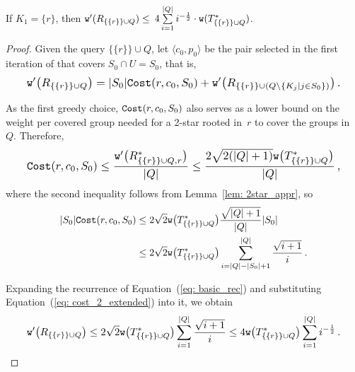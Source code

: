 \begin{lemma}
\label{lem: basic_appr}
    If $K_1=\{r\}$, then $\mathtt{w}'(R_{\{\{r\}\} \cup Q})\leq$
    $4\sum\limits_{i=1}^{|Q|}i^{-\frac{1}{2}}\cdot\mathtt{w}(T^*_{\{\{r\}\}\cup Q})$.
\end{lemma}
\begin{proof}
    Given the query $\{\{r\}\} \cup Q$, let $\langle c_0,p_0 \rangle$ be the pair selected in the first iteration of \Basic that covers $S_0 \cap U = S_0$, that is,
    \begin{equation}
    \label{eq: basic_rec}
    \resizebox{0.92\linewidth}{!}{$
    \displaystyle
        \w'\big(R_{\{\{r\}\}\cup Q}\big) = |S_0|\Cost(r,c_0,S_0) + \w'\big(R_{\{\{r\}\}\cup( Q\setminus \{K_j \mid j \in S_0\} )}\big) \,.
    $}
    \end{equation}
    
    As the first greedy choice, $\mathtt{Cost}(r,c_0,S_0)$ also serves as a lower bound on the weight per covered group needed for a 2-star rooted in~$r$ to cover the groups in~$Q$. Therefore,
    \begin{equation}
    \label{eq: cost_2}
    \resizebox{0.92\linewidth}{!}{$
    \displaystyle
        \Cost(r,c_0,S_0) \leq \frac{\w'\big(R^*_{\{\{r\}\}\cup Q, r}\big)}{|Q|} \leq \frac{2\sqrt{2(|Q|+1)}\w\big(T^*_{\{\{r\}\}\cup Q}\big)}{|Q|} \,,
    $}
    \end{equation}
    \noindent where the second inequality follows from Lemma~\ref{lem: 2star_appr}, so
    \begin{equation}
    \begin{aligned}
    \label{eq: cost_2_extended}
        |S_0|\mathtt{Cost}(r,c_0,S_0) & \leq 2\sqrt{2}\mathtt{w}\big(T^*_{\{\{r\}\}\cup Q}\big)\frac{\sqrt{|Q|+1}}{|Q|}|S_0| \\
        & \leq 2\sqrt{2}\mathtt{w}\big(T^*_{\{\{r\}\}\cup Q}\big)\sum_{i=|Q|-|S_0|+1}^{|Q|}{\frac{\sqrt{i+1}}{i}} \,.
    \end{aligned}
    \end{equation}
    
    Expanding the recurrence of Equation~(\ref{eq: basic_rec}) and substituting Equation~(\ref{eq: cost_2_extended}) into it, we obtain
    \begin{equation}
    \resizebox{0.92\linewidth}{!}{$
    \displaystyle
    \label{eq: appr_4}
    \w'\big(R_{\{\{r\}\}\cup Q}\big) \leq 2\sqrt{2}\w\big(T^*_{\{\{r\}\}\cup Q}\big)\sum_{i=1}^{|Q|}{\frac{\sqrt{i+1}}{i}} \leq 4\w\big(T^*_{\{\{r\}\}\cup Q}\big)
    \sum_{i=1}^{|Q|} i^{-\frac{1}{2}} \,.
    $}
    \end{equation}
\end{proof}

